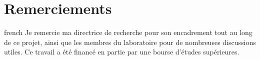 \chapter*{Remerciements}
\label{chap-remerciements}

\begin{otherlanguage*}{french}
Je remercie ma directrice de recherche pour son encadrement tout au long de
ce projet, ainsi que les membres du laboratoire pour de nombreuses
discussions utiles. Ce travail a \'et\'e financ\'e en partie par une bourse
d'\'etudes sup\'erieures.
\end{otherlanguage*}
